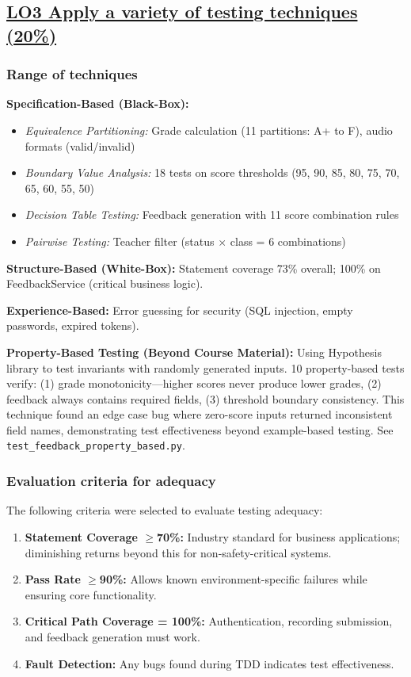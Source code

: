 \documentclass[sigconf]{acmart}
\begin{document}
\subsection{\href{https://github.com/JoshAn0107/speakright.uk/blob/main/LO3_COMPLETE.md}{LO3 Apply a variety of testing techniques (20\%)}}

\subsubsection{Range of techniques}

\textbf{Specification-Based (Black-Box):}
\begin{itemize}[noitemsep]
    \item \textit{Equivalence Partitioning:} Grade calculation (11 partitions: A+ to F), audio formats (valid/invalid)
    \item \textit{Boundary Value Analysis:} 18 tests on score thresholds (95, 90, 85, 80, 75, 70, 65, 60, 55, 50)
    \item \textit{Decision Table Testing:} Feedback generation with 11 score combination rules
    \item \textit{Pairwise Testing:} Teacher filter (status $\times$ class = 6 combinations)
\end{itemize}

\textbf{Structure-Based (White-Box):} Statement coverage 73\% overall; 100\% on FeedbackService (critical business logic).

\textbf{Experience-Based:} Error guessing for security (SQL injection, empty passwords, expired tokens).

\textbf{Property-Based Testing (Beyond Course Material):} Using Hypothesis library to test invariants with randomly generated inputs. 10 property-based tests verify: (1) grade monotonicity---higher scores never produce lower grades, (2) feedback always contains required fields, (3) threshold boundary consistency. This technique found an edge case bug where zero-score inputs returned inconsistent field names, demonstrating test effectiveness beyond example-based testing. See \texttt{test\_feedback\_property\_based.py}.

\subsubsection{Evaluation criteria for adequacy}

The following criteria were selected to evaluate testing adequacy:
\begin{enumerate}[noitemsep]
    \item \textbf{Statement Coverage $\geq$70\%:} Industry standard for business applications; diminishing returns beyond this for non-safety-critical systems.
    \item \textbf{Pass Rate $\geq$90\%:} Allows known environment-specific failures while ensuring core functionality.
    \item \textbf{Critical Path Coverage = 100\%:} Authentication, recording submission, and feedback generation must work.
    \item \textbf{Fault Detection:} Any bugs found during TDD indicates test effectiveness.
\end{enumerate}
\end{document}
